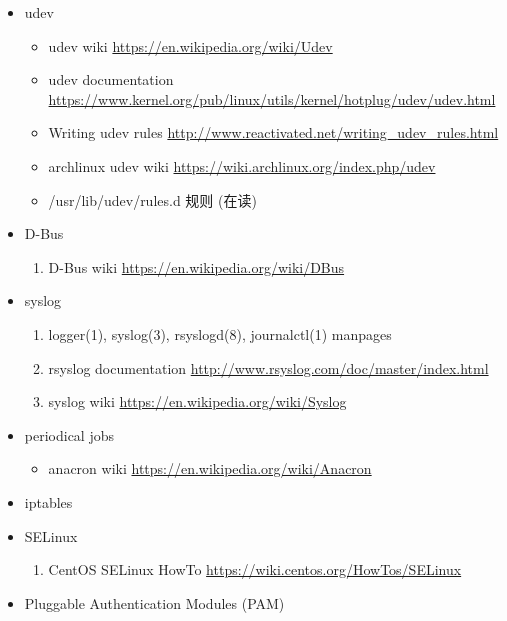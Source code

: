 \documentclass{article}
\begin{document}
\begin{itemize}
    \item udev
        \begin{itemize}
            \item udev wiki \url{https://en.wikipedia.org/wiki/Udev}
            \item udev documentation \url{https://www.kernel.org/pub/linux/utils/kernel/hotplug/udev/udev.html}
            \item Writing udev rules \url{http://www.reactivated.net/writing_udev_rules.html}
            \item archlinux udev wiki \url{https://wiki.archlinux.org/index.php/udev}
            \item /usr/lib/udev/rules.d 规则 (在读)
        \end{itemize}
    \item D-Bus
        \begin{enumerate}
            \item D-Bus wiki \url{https://en.wikipedia.org/wiki/DBus}
        \end{enumerate}
    \item syslog
        \begin{enumerate}
            \item logger(1), syslog(3), rsyslogd(8), journalctl(1) manpages
            \item rsyslog documentation \url{http://www.rsyslog.com/doc/master/index.html}
            \item syslog wiki \url{https://en.wikipedia.org/wiki/Syslog}
        \end{enumerate}
    \item periodical jobs
        \begin{itemize}
            \item anacron wiki \url{https://en.wikipedia.org/wiki/Anacron}
        \end{itemize}
    \item iptables
        \begin{enumerate}
        \end{enumerate}
    \item SELinux
        \begin{enumerate}
            \item CentOS SELinux HowTo \url{https://wiki.centos.org/HowTos/SELinux}
        \end{enumerate}
    \item Pluggable Authentication Modules (PAM)
        \begin{enumerate}

\end{enumerate}
\end{itemize}
\end{document}
